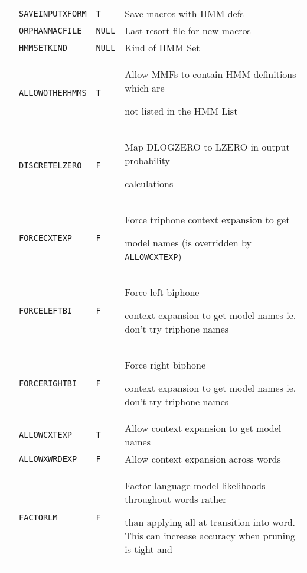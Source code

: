 \begin{center}
\begin{supertabular}{|p{1.8cm}|l|l|p{6.6cm}|}
  & \texttt{SAVEINPUTXFORM} & \texttt{T} & Save  macros with HMM defs \\ 


  & \texttt{ORPHANMACFILE} & \texttt{NULL} & Last resort file for new macros \\ 


  & \texttt{HMMSETKIND} & \texttt{NULL} & Kind of HMM Set \\ 


  & \texttt{ALLOWOTHERHMMS} & \texttt{T} & Allow MMFs to contain HMM definitions which are 


  not listed in the HMM List \\ 


  & \texttt{DISCRETELZERO}  & \texttt{F} & Map DLOGZERO to LZERO in output probability 


  calculations \\ \hline







  & \texttt{FORCECXTEXP} & \texttt{F} & Force triphone context expansion to get 


  model names (is overridden by \texttt{ALLOWCXTEXP}) \\ 


  & \texttt{FORCELEFTBI} & \texttt{F} & Force left biphone


  context expansion to get model names ie. don't try triphone names \\ 


  & \texttt{FORCERIGHTBI} & \texttt{F} & Force right biphone


  context expansion to get model names ie. don't try triphone names \\ 




  & \texttt{ALLOWCXTEXP}  & \texttt{T} & Allow context expansion to get model names \\ 


  & \texttt{ALLOWXWRDEXP} & \texttt{F} & Allow context expansion across words \\ 


  & \texttt{FACTORLM}     & \texttt{F} & Factor language model likelihoods throughout words rather 


  than applying all at transition into word. This can increase accuracy when pruning is tight and 



\end{supertabular}
\end{center}
